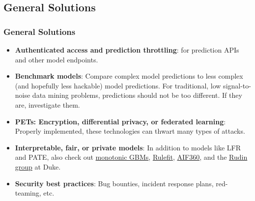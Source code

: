 \documentclass[11pt,
               aspectratio=169,
               hyperref={colorlinks}
               ]{beamer}
\begin{document}
		\subsection{General Solutions}
	
			\begin{frame}[t]	
		
				\frametitle{General Solutions}	
				\scriptsize
				\small
				\begin{itemize}
					\item \textbf{Authenticated access and prediction throttling}: for prediction APIs and other model endpoints.
					\item \textbf{Benchmark models}: Compare complex model predictions to less complex (and hopefully less hackable) model predictions. For traditional, low signal-to-noise data mining problems, predictions should not be too different. If they are, investigate them.
					\item \textbf{PETs: Encryption, differential privacy, or federated learning}: Properly implemented, these technologies can thwart many types of attacks.
					\item \textbf{Interpretable, fair, or private models}: In addition to models like LFR and PATE, also check out \href{https://github.com/h2oai/h2o-3/blob/master/h2o-py/demos/H2O_tutorial_gbm_monotonicity.ipynb}{monotonic GBMs}, \href{https://christophm.github.io/interpretable-ml-book/rulefit.html}{Rulefit}, \href{https://github.com/IBM/AIF360}{AIF360}, and the \href{https://users.cs.duke.edu/~cynthia/code.html}{Rudin group} at Duke.
					\item \textbf{Security best practices}: Bug bounties, incident response plans, red-teaming, etc. 
				\end{itemize}
			\end{frame}
			
\end{document}
